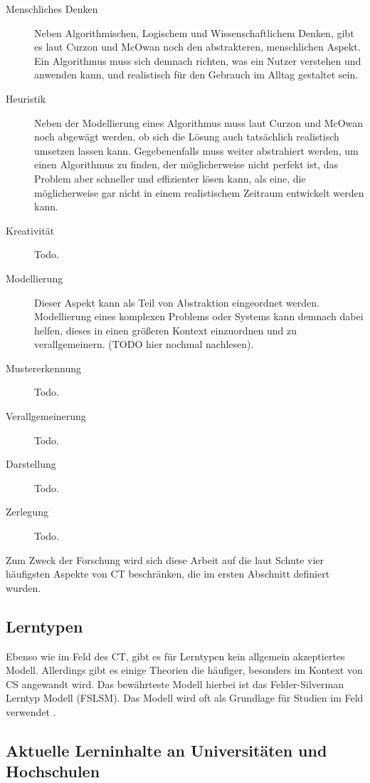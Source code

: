 \begin{description}
    \item[Menschliches Denken] Neben Algorithmischen, Logischem und Wissenschaftlichem Denken, gibt es laut Curzon und McOwan \cite{curzon} noch den abstrakteren, menschlichen Aspekt. Ein Algorithmus muss sich demnach richten, was ein Nutzer verstehen und anwenden kann, und realistisch für den Gebrauch im Alltag gestaltet sein.
    \item[Heuristik] Neben der Modellierung eines Algorithmus muss laut Curzon und McOwan noch abgewägt werden, ob sich die Lösung auch tatsächlich realistisch umsetzen lassen kann. Gegebenenfalls muss weiter abstrahiert werden, um einen Algorithmus zu finden, der möglicherweise nicht perfekt ist, das Problem aber schneller und effizienter lösen kann, als eine, die möglicherweise gar nicht in einem realistischem Zeitraum entwickelt werden kann.
    \item[Kreativität] Todo.
    \item[Modellierung] Dieser Aspekt kann als Teil von Abstraktion eingeordnet werden. Modellierung eines komplexen Problems oder Systems kann demnach dabei helfen, dieses in einen größeren Kontext einzuordnen und zu verallgemeinern. (TODO hier nochmal nachlesen).
    \item[Mustererkennung] Todo.
    \item[Verallgemeinerung] Todo.
    \item[Darstellung] Todo.
    \item[Zerlegung] Todo.
\end{description} 


    Zum Zweck der Forschung wird sich diese Arbeit auf die laut Schute vier häufigsten Aspekte von CT beschränken, die im ersten Abschnitt definiert wurden.

\subsection{Lerntypen}
Ebenso wie im Feld des CT, gibt es für Lerntypen kein allgemein akzeptiertes Modell. Allerdings gibt es einige Theorien die häufiger, besonders im Kontext von CS angewandt wird. Das bewährteste Modell hierbei ist das Felder-Silverman Lerntyp Modell (FSLSM). Das Modell wird oft als Grundlage für Studien im Feld verwendet .

\subsection{Aktuelle Lerninhalte an Universitäten und Hochschulen}


